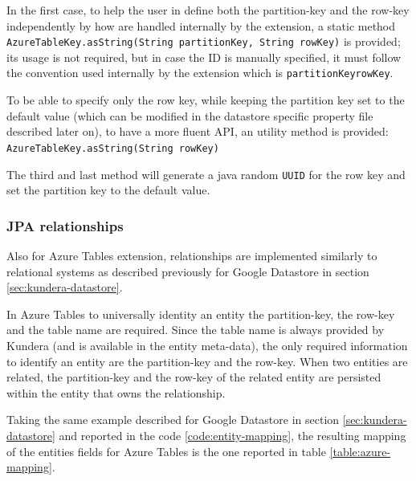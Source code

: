 \noindent In the first case, to help the user in define both the partition-key and the row-key independently by how are handled internally by the extension, a static method \texttt{AzureTableKey.asString(String partitionKey, String rowKey)} is provided; its usage is not required, but in case the ID is manually specified, it must follow the convention used internally by the extension which is \texttt{partitionKey\textunderscore rowKey}.

\noindent To be able to specify only the row key, while keeping the partition key set to the default value (which can be modified in the datastore specific property file described later on), to have a more fluent API, an utility method is provided: \texttt{AzureTableKey.asString(String rowKey)} 

\noindent The third and last method will generate a java random \texttt{UUID} for the row key and set the partition key to the default value.

\subsubsection{JPA relationships}
Also for Azure Tables extension, relationships are implemented similarly to relational systems as described previously for Google Datastore in section \ref{sec:kundera-datastore}.

\noindent In Azure Tables to universally identity an entity the partition-key, the row-key and the table name are required. Since the table name is always provided by Kundera (and is available in the entity meta-data), the only required information to identify an entity are the partition-key and the row-key.
When two entities are related, the partition-key and the row-key of the related entity are persisted within the entity that owns the relationship.


\newparagraph Taking the same example described for Google Datastore in section \ref{sec:kundera-datastore} and reported in the code \ref{code:entity-mapping}, the resulting mapping of the entities fields for Azure Tables is the one reported in table \ref{table:azure-mapping}.

\begin{table}[ht]
\vspace{1em}
\small
\centering
{}
\\
\caption{Mapping of entity fields on Azure Tables}
\label{table:azure-mapping}
\end{table}

